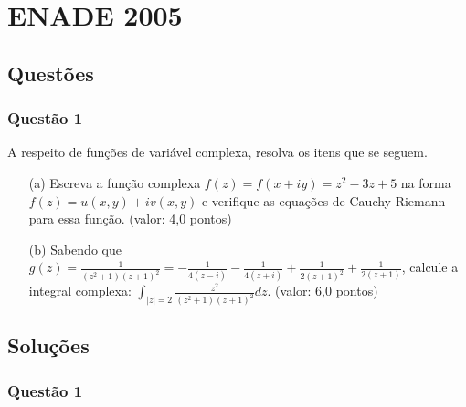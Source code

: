 \documentclass{report}
\begin{document}
\chapter{ENADE 2005}

\section{\color{blue} Quest\~oes}

\subsection{\color{blue} Quest\~ao 1}

A respeito de fun\c c\~oes de vari\'avel complexa, resolva os itens que se seguem.

\begin{enumerate}

\item[(a)] Escreva a fun\c c\~ao complexa $f(z) = f(x + iy) = z^2 -3z + 5$ na forma $f(z) = u(x, y) + i v(x, y)$ e verifique as equa\c c\~oes de Cauchy-Riemann para essa fun\c c\~ao. (valor: 4,0 pontos)

\item[(b)] Sabendo que $g(z)=\displaystyle \frac1{(z^2+1)(z+1)^2}=-\frac1{4(z-i)}-\frac1{4(z+i)}+\frac1{2(z+1)^2}+\frac1{2(z+1)}$, calcule a integral complexa: $\displaystyle \int_{|z|=2}\frac{z^2}{(z^2+1)(z+1)^2}dz$. (valor: 6,0 pontos)

\end{enumerate}

\section{\color{red} Solu\c c\~oes}

\subsection{\color{red} Quest\~ao 1}
\end{document}
